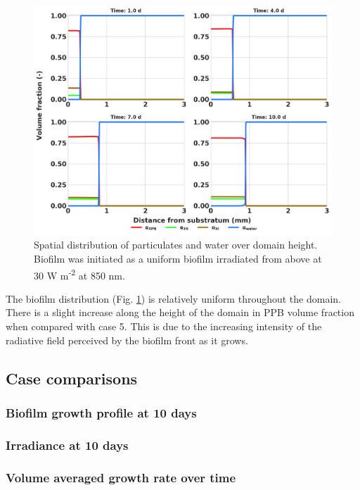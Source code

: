 \begin{figure}[H]
    \centering
    \includegraphics[width=\textwidth,height=0.45\textheight]{Chap4/methods/output/case6.png}
    \caption{Spatial distribution of particulates and water over domain height. Biofilm was initiated as a uniform biofilm irradiated from above at 30 W m\textsuperscript{-2} at 850 nm.} 
    \label{fig:case6_dist_frac}
\end{figure}

The biofilm distribution (Fig. \ref{fig:case6_dist_frac}) is relatively uniform throughout the domain. There is a slight increase along the height of the domain in PPB volume fraction when compared with case 5. This is due to the increasing intensity of the radiative field perceived by the biofilm front as it grows. 

\subsection{Case comparisons}
\subsubsection{Biofilm growth profile at 10 days}



\subsubsection{Irradiance at 10 days}



\subsubsection{Volume averaged growth rate over time}



